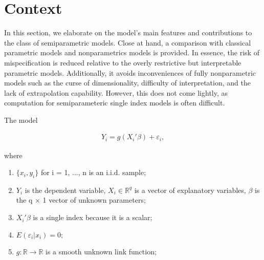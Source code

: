\documentclass[a4paper]{article}
\begin{document}



\section{Context} %
\label{sec:context}
In this section, we elaborate on the model's main features and contributions to the class of semiparametric models. Close at hand, a comparison with classical parametric models and nonparametrics models is provided. In essence, the risk of mispecification is reduced relative to the overly restrictive but interpretable parametric models. Additionally, it avoids inconveniences of fully nonparametric models such as the curse of dimensionality, difficulty of interpretation, and the lack of extrapolation capability. However, this does not come lightly, as computation for semiparameteric single index models is often difficult.

\vspace{2mm} 
The model
 
\begin{eqnarray}
Y_i = g(X_i'\beta) + \varepsilon_i,
\end{eqnarray}

where

\begin{enumerate}[label=(\roman*)]
		\item $\{x_i,y_i\}$ for i = 1, ..., n is an i.i.d. sample;
		\item $Y_{i}$ is the dependent variable, $X_i \in \mathbb{R}^{q}$ is a vector of explanatory variables, $\beta$ is the q $\times$ 1 vector of unknown parameters; 
	\item $X_i'\beta$ is a single index because it is a scalar;
	\item $ E(\varepsilon_i|x_i) = 0 $;
	\item $g: \mathbb{R} \rightarrow \mathbb{R} $ is a smooth unknown link function; 
\end{enumerate}
\end{document}
